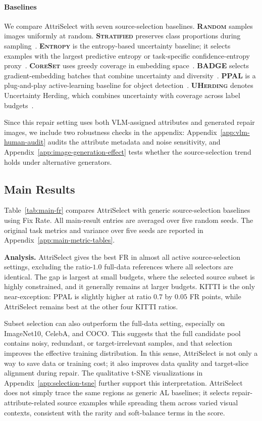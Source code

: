 \documentclass{article}
\newcommand{\model}{AttriSelect\xspace}
\begin{document}
\paragraph{Baselines}
We compare \model with seven source-selection baselines. \textbf{\textsc{Random}} samples images uniformly at random. \textbf{\textsc{Stratified}} preserves class proportions during sampling~\citep{neyman1934two}. \textbf{\textsc{Entropy}} is the entropy-based uncertainty baseline; it selects examples with the largest predictive entropy or task-specific confidence-entropy proxy~\citep{settles2009active}. \textbf{\textsc{CoreSet}} uses greedy coverage in embedding space~\citep{sener2018active}. \textbf{\textsc{BADGE}} selects gradient-embedding batches that combine uncertainty and diversity~\citep{ash2020deep}. \textbf{\textsc{PPAL}} is a plug-and-play active-learning baseline for object detection~\citep{yang2024ppal}. \textbf{\textsc{UHerding}} denotes Uncertainty Herding, which combines uncertainty with coverage across label budgets~\citep{bae2025uncertainty}.

Since this repair setting uses both VLM-assigned attributes and generated repair images, we include two robustness checks in the appendix: Appendix~\ref{app:vlm-human-audit} audits the attribute metadata and noise sensitivity, and Appendix~\ref{app:image-generation-effect} tests whether the source-selection trend holds under alternative generators.

\subsection{Main Results}

Table~\ref{tab:main-fr} compares \model with generic source-selection baselines using Fix Rate. All main-result entries are averaged over five random seeds. The original task metrics and variance over five seeds are reported in Appendix~\ref{app:main-metric-tables}.

\noindent\textbf{Analysis.} \model gives the best FR in almost all active source-selection settings, excluding the ratio-$1.0$ full-data references where all selectors are identical. The gap is largest at small budgets, where the selected source subset is highly constrained, and it generally remains at larger budgets. KITTI is the only near-exception: PPAL is slightly higher at ratio $0.7$ by $0.05$ FR points, while \model remains best at the other four KITTI ratios.

Subset selection can also outperform the full-data setting, especially on ImageNet10, CelebA, and COCO. This suggests that the full candidate pool contains noisy, redundant, or target-irrelevant samples, and that selection improves the effective training distribution. In this sense, \model is not only a way to save data or training cost; it also improves data quality and target-slice alignment during repair. The qualitative t-SNE visualizations in Appendix~\ref{app:selection-tsne} further support this interpretation. \model does not simply trace the same regions as generic AL baselines; it selects repair-attribute-related source examples while spreading them across varied visual contexts, consistent with the rarity and soft-balance terms in the score.
\end{document}
